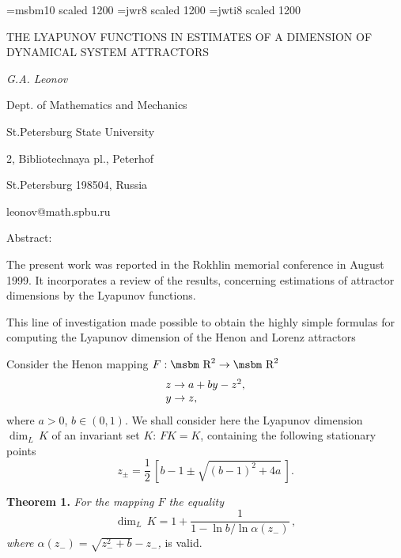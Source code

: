 
\topmargin=-10mm
\oddsidemargin=-5mm
\evensidemargin=-5mm
\textwidth 16cm
\textheight 23cm
\hfuzz=1.5pt
\makeindex

\font\msbm=msbm10 scaled 1200
\font\wr=jwr8 scaled 1200
\font\wit=jwti8 scaled 1200

\def\al {\alpha}
\def\ba{\begin{array}}
\def\be {\beta}
\def\br {\hbox{\msbm R}}
\def\de {\delta}
\def\ea{\end{array}}
\def\e  {\eta}
\def\ga {\gamma}
\def\f  {\frac}
\def\la {\lambda}
\def\liml{\lim\limits}
\def\om {\omega}
\def\sg {\sigma}
\def\t  {\tau}
\def\ve {\varepsilon}



\pagestyle{plain}
\large

\begin{center}
THE LYAPUNOV FUNCTIONS IN ESTIMATES OF A DIMENSION OF DYNAMICAL
SYSTEM ATTRACTORS


\medskip

{\it G.A. Leonov}

\smallskip

{Dept. of Mathematics and Mechanics}

{St.Petersburg State University}

{2, Bibliotechnaya pl., Peterhof}

{St.Petersburg 198504, Russia}

{leonov@math.spbu.ru}
\end{center}

\medskip

{\wit
Abstract:
}

\bigskip

\medskip

The present work was reported in the Rokhlin memorial conference in August
1999. It incorporates a review of the results, concerning  estimations of
attractor dimensions by the Lyapunov functions.

This line of investigation made possible to obtain the highly simple formulas
for computing the Lyapunov dimension of the Henon and Lorenz attractors

Consider the Henon mapping $F:\br^2\to\br^2$
$$
\ba{l}
z\to a+by-z^2,\cr
y\to z,
\ea
$$
where $a>0$, $b\in(0,1)$.
We shall consider here the Lyapunov dimension $\dim_L\,K$ of an invariant
set $K$: $FK=K$, containing the following stationary points
$$
z_{\pm}=\f12\,\left[b-1\pm\sqrt{(b-1)^2+4a}\,\right].
$$

{\bf Theorem 1.} {\it
For the mapping $F$ the equality
$$
\dim_L\,K=1+\f1{1-\ln b/\ln\al(z_-)}\,,
$$
where $\al(z_-)=\sqrt{z_-^2+b}-z_-$,
}
is valid.
\medskip


